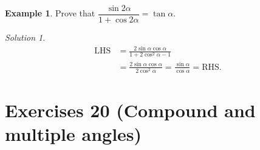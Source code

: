 \documentclass[
  english,
  12pt,
  oneside]{book}
\theoremstyle{definition}
\theoremstyle{definition}
\newtheorem{example}{Example}[chapter]
\theoremstyle{definition}
\theoremstyle{definition}
\theoremstyle{remark}
\newtheorem*{solution}{Solution}
\begin{document}
\begin{example}
Prove that \(\dfrac{\sin2\alpha}{1+\cos2\alpha}=\tan\alpha\).
\end{example}

\begin{solution}
\begin{align*}
\mathrm{LHS} &=
\frac{2\sin\alpha\cos\alpha}{1+2\cos^2\alpha -1}\\
&= \frac{2\sin\alpha\cos\alpha}{2\cos^2\alpha} = \frac{\sin\alpha}{\cos\alpha} = \mathrm{RHS}.
\end{align*}
\end{solution}

\chapter*{Exercises 20 (Compound and multiple angles)}\label{exercises-20-compound-and-multiple-angles}
\end{document}
